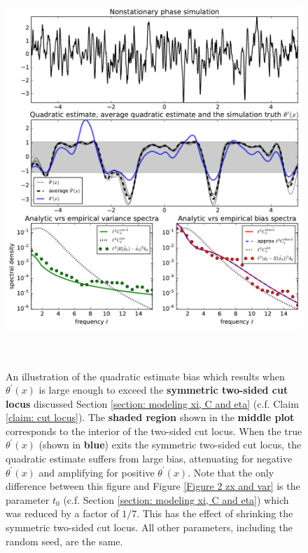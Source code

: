 \documentclass[10pt,noinfoline]{imsart}
\begin{document}
\begin{figure}
\includegraphics[height=15cm]{figure3.pdf}%
\caption{ An illustration of the quadratic estimate bias which results when $\theta^\prime(x)$ is large enough to exceed the \textbf{symmetric two-sided cut locus} discussed Section \ref{section: modeling xi, C and eta} (c.f. Claim \ref{claim: cut locus}). The \textbf{shaded region} shown in the \textbf{middle plot} corresponds to the interior of the two-sided cut locus. When the true  $\theta^\prime(x)$ (shown in \textbf{blue}) exits the symmetric two-sided cut locus, the quadratic estimate suffers from large bias, attenuating for negative $\theta^\prime(x)$ and amplifying for positive $\theta^\prime(x)$. Note that the only difference between this figure and Figure \ref{Figure 2 zx and var} is the parameter $t_0$ (c.f. Section \ref{section: modeling xi, C and eta}) which was reduced by a factor of $1/7$. This has the effect of shrinking the symmetric two-sided cut locus. All other parameters, including the random seed, are the same.}
\label{Figure 2 zx and var, extra bias}
\end{figure}
\end{document}
